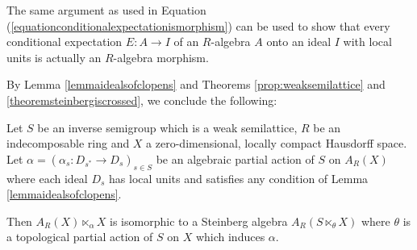 \begin{remark}
The same argument as used in Equation (\ref{equationconditionalexpectationismorphism}) can be used to show that every conditional expectation $E:A\to I$ of an $R$-algebra $A$ onto an ideal $I$ with local units is actually an $R$-algebra morphism.
\end{remark}

By Lemma \ref{lemmaidealsofclopens} and Theorems \ref{prop:weaksemilattice} and \ref{theoremsteinbergiscrossed}, we conclude the following:

\begin{theorem}\label{theoremcrossedproductasasteinbergalgebra}
Let $S$ be an inverse semigroup which is a weak semilattice, $R$ be an indecomposable ring and $X$ a zero-dimensional, locally compact Hausdorff space. Let $\alpha=\left(\alpha_s:D_{s^*}\to D_s\right)_{s\in S}$ be an algebraic partial action of $S$ on $A_R(X)$ where each ideal $D_s$ has local units and satisfies any condition of Lemma \ref{lemmaidealsofclopens}.

Then  $A_R(X)\ltimes_{\alpha} X$ is isomorphic to a Steinberg algebra $A_R(S\ltimes_{\theta} X)$ where $\theta$ is a topological partial action of $S$ on $X$ which induces $\alpha$.
\end{theorem}